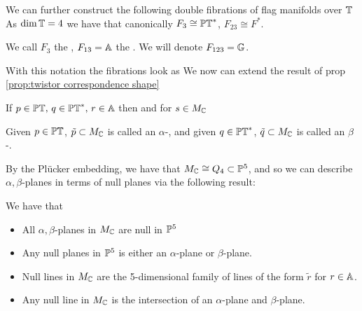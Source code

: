 \documentclass{article}
\begin{document}
We can further construct the following double fibrations of flag manifolds over $\mathbb{T}$ 
As $\dim \mathbb{T}=4$ we have that canonically $F_3 \cong \mathbb{PT}^\ast$, $F_{23} \cong F^\ast$. 
\begin{definition}
 We call $F_3$ the , $F_{13} = \mathbb{A}$ the . We will denote $F_{123} = \mathbb{G}$. 
\end{definition}
With this notation the  fibrations look as 
We now can extend the result of prop \ref{prop:twistor correspondence shape}
\begin{prop}
	If $p \in \mathbb{PT}, \, q \in \mathbb{PT}^\ast,\, r \in \mathbb{A}$ then 
and for $s \in M_{\mathbb{C}}$
\end{prop}
\begin{definition}
	Given $p \in \mathbb{PT}$, $\tilde{p} \subset M_{\mathbb{C}}$ is called an $\alpha$-, and given $q \in \mathbb{PT}^\ast$, $\tilde{q} \subset M_{\mathbb{C}}$ is called an $\beta$-.
\end{definition}

By the Pl\"ucker embedding, we have that $M_{\mathbb{C}} \cong Q_4 \subset \mathbb{P}^5$, and so we can describe $\alpha,\beta$-planes in terms of null planes via the following result:
\begin{prop}
	We have that
	\begin{itemize}
		\item All $\alpha,\beta$-planes in $M_{\mathbb{C}}$ are null in $\mathbb{P}^5$
		\item Any null planes in $\mathbb{P}^5$ is either an $\alpha$-plane or $\beta$-plane.
		\item Null lines in $M_{\mathbb{C}}$ are the 5-dimensional family of lines of the form $\tilde{r}$ for $r\in \mathbb{A}$.
		\item Any null line in $M_{\mathbb{C}}$ is the intersection of an $\alpha$-plane and $\beta$-plane.  
	\end{itemize}
\end{prop}
\end{document}
